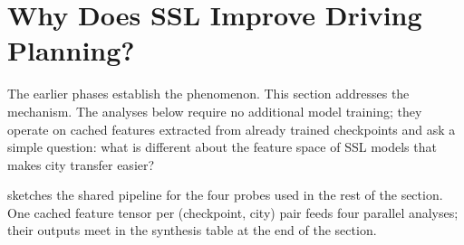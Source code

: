 \section{Why Does SSL Improve Driving Planning?}
\label{sec:exp-why-ssl}

The earlier phases establish the phenomenon. This section addresses the mechanism. The analyses below require no additional model training; they operate on cached features extracted from already trained checkpoints and ask a simple question: what is different about the feature space of SSL models that makes city transfer easier?

 sketches the shared pipeline for the four probes used in the rest of the section. One cached feature tensor per (checkpoint, city) pair feeds four parallel analyses; their outputs meet in the synthesis table at the end of the section.

